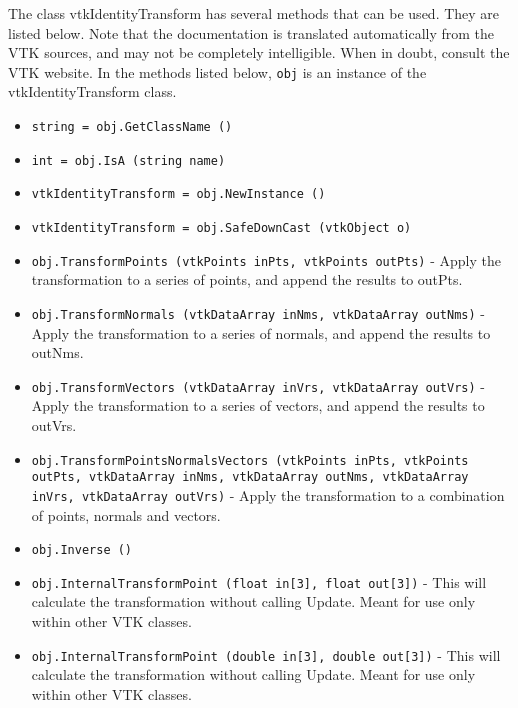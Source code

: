 The class vtkIdentityTransform has several methods that can be used.
  They are listed below.
Note that the documentation is translated automatically from the VTK sources,
and may not be completely intelligible.  When in doubt, consult the VTK website.
In the methods listed below, \verb|obj| is an instance of the vtkIdentityTransform class.
\begin{itemize}
\item  \verb|string = obj.GetClassName ()|

\item  \verb|int = obj.IsA (string name)|

\item  \verb|vtkIdentityTransform = obj.NewInstance ()|

\item  \verb|vtkIdentityTransform = obj.SafeDownCast (vtkObject o)|

\item  \verb|obj.TransformPoints (vtkPoints inPts, vtkPoints outPts)| -  Apply the transformation to a series of points, and append the
 results to outPts.  

\item  \verb|obj.TransformNormals (vtkDataArray inNms, vtkDataArray outNms)| -  Apply the transformation to a series of normals, and append the
 results to outNms.  

\item  \verb|obj.TransformVectors (vtkDataArray inVrs, vtkDataArray outVrs)| -  Apply the transformation to a series of vectors, and append the
 results to outVrs.  

\item  \verb|obj.TransformPointsNormalsVectors (vtkPoints inPts, vtkPoints outPts, vtkDataArray inNms, vtkDataArray outNms, vtkDataArray inVrs, vtkDataArray outVrs)| -  Apply the transformation to a combination of points, normals
 and vectors.  

\item  \verb|obj.Inverse ()|

\item  \verb|obj.InternalTransformPoint (float in[3], float out[3])| -  This will calculate the transformation without calling Update.
 Meant for use only within other VTK classes.

\item  \verb|obj.InternalTransformPoint (double in[3], double out[3])| -  This will calculate the transformation without calling Update.
 Meant for use only within other VTK classes.


\end{itemize}
